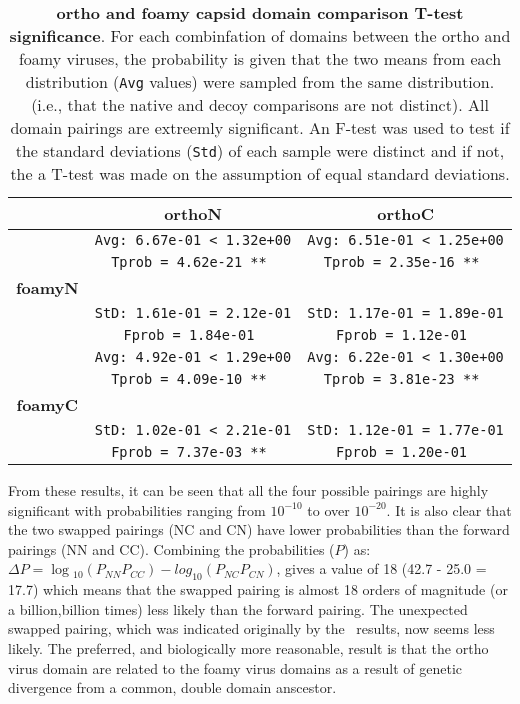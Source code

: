 \begin{table}
\centering
\begin{tabular}{c|c|c|}
             &          {\bf orthoN}           &          {\bf orthoC}           \\
\hline \hline
             & {\tt Avg: 6.67e-01 < 1.32e+00 } & {\tt Avg: 6.51e-01 < 1.25e+00 } \\
             & {\tt Tprob = 4.62e-21 **      } & {\tt Tprob = 2.35e-16 **      } \\
{\bf foamyN} &                                 &                                 \\
             & {\tt StD: 1.61e-01 = 2.12e-01 } & {\tt StD: 1.17e-01 = 1.89e-01 } \\
             & {\tt Fprob = 1.84e-01         } & {\tt Fprob = 1.12e-01         } \\
\hline
             & {\tt Avg: 4.92e-01 < 1.29e+00 } & {\tt Avg: 6.22e-01 < 1.30e+00 } \\
             & {\tt Tprob = 4.09e-10 **      } & {\tt Tprob = 3.81e-23 **      } \\
{\bf foamyC} &                                 &                                 \\
             & {\tt StD: 1.02e-01 < 2.21e-01 } & {\tt StD: 1.12e-01 = 1.77e-01 } \\
             & {\tt Fprob = 7.37e-03 **      } & {\tt Fprob = 1.20e-01         } \\
\hline \hline
\end{tabular}
\begin{footnotesize}
\caption{
\label{Tab:Ttest}
{\bf ortho and foamy capsid domain comparison T-test significance}.
For each combinfation of domains between the ortho and foamy viruses, the probability
is given that the two means from each distribution ({\tt Avg} values) were sampled
from the same distribution.  (i.e., that the native and decoy comparisons are
not distinct).   All domain pairings are extreemly significant.   An F-test was used to
test if the standard deviations ({\tt Std}) of each sample were distinct and if not,
the a T-test was made on the assumption of equal standard deviations.
}
\end{footnotesize}
\end{table}

From these results, it can be seen that all the four possible pairings are
highly significant with probabilities ranging from $10^{-10}$ to over $10^{-20}$.
It is also clear that the two swapped pairings (NC and CN) have lower probabilities
than the forward pairings (NN and CC).   Combining the probabilities ($P$) as:
$\Delta P = \log{_10}(P_{NN} P_{CC}) - log_{10}(P_{NC} P_{CN})$,
gives a value of 18 (42.7 - 25.0 = 17.7) which means that the swapped pairing is almost 18
orders of magnitude (or a billion,billion times) less likely than the forward pairing.
The unexpected swapped pairing, which was indicated originally by the \DALI\ results, now seems
less likely.  The preferred, and biologically more reasonable, result is that the ortho virus
domain are related to the foamy virus domains as a result of genetic divergence from
a common, double domain anscestor. 

